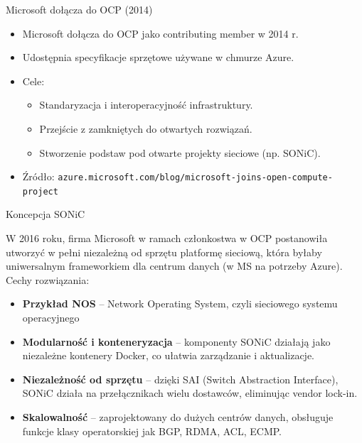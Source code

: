 \documentclass[aspectratio=169]{beamer}
\begin{document}
\begin{frame}{Microsoft dołącza do OCP (2014)}
\begin{itemize}
    \item Microsoft dołącza do OCP jako contributing member w 2014 r.
    \item Udostępnia specyfikacje sprzętowe używane w chmurze Azure.
    \item Cele:
    \begin{itemize}
        \item Standaryzacja i interoperacyjność infrastruktury.
        \item Przejście z zamkniętych do otwartych rozwiązań.
        \item Stworzenie podstaw pod otwarte projekty sieciowe (np. SONiC).
    \end{itemize}
    \item Źródło: \texttt{azure.microsoft.com/blog/microsoft-joins-open-compute-project}
\end{itemize}
\end{frame}

\begin{frame}{Koncepcja SONiC}

    W 2016 roku, firma Microsoft w ramach członkostwa w OCP postanowiła utworzyć w pełni niezależną od sprzętu platformę sieciową, która byłaby uniwersalnym frameworkiem dla centrum danych (w MS na potrzeby Azure). Cechy rozwiązania:


    \begin{itemize}
    \item \textbf{Przykład NOS} -- Network Operating System, czyli sieciowego systemu operacyjnego
    \item \textbf{Modularność i konteneryzacja} -- komponenty SONiC działają jako niezależne kontenery Docker, co ułatwia zarządzanie i aktualizacje.
    \item \textbf{Niezależność od sprzętu} -- dzięki SAI (Switch Abstraction Interface), SONiC działa na przełącznikach wielu dostawców, eliminując vendor lock-in.
    \item \textbf{Skalowalność} -- zaprojektowany do dużych centrów danych, obsługuje funkcje klasy operatorskiej jak BGP, RDMA, ACL, ECMP.
  \end{itemize}
\end{frame}
\end{document}
